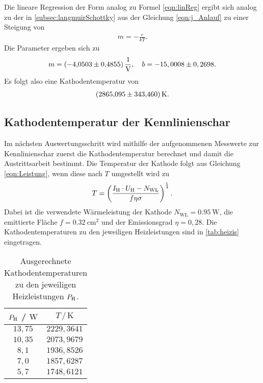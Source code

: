 \noindent
Die lineare Regression der Form analog zu Formel \eqref{eqn:linReg} ergibt sich analog zu der in \autoref{subsec:langmuirSchottky} aus der Gleichung \eqref{eqn:j_Anlauf} zu einer Steigung von
\begin{align}
  \label{eqn:steigung}
  m = -\frac{e}{kT}.
\end{align}
Die Parameter ergeben sich zu
\begin{align*}
  m =  \SI{-4,0503 \pm 0,4855}{\per\volt}, \quad
  b = -15,0008 \pm 0,2698.
\end{align*}
\noindent
Es folgt also eine Kathodentemperatur von
\begin{align*}
  \SI{2865,095 \pm 343,460}{\kelvin}.
\end{align*}

\subsection{Kathodentemperatur der Kennlinienschar}
\label{subsec:kathodenTempSchar}

Im nächsten Auswertungsschritt wird mithilfe der aufgenommenen Messwerte zur Kennlinienschar zuerst die Kathodentemperatur berechnet und damit
die Austrittsarbeit bestimmt. Die Temperatur der Kathode folgt aus Gleichung \eqref{eqn:Leistung}, wenn diese nach $T$ umgestellt wird zu 
\begin{align}
  T = \left(\frac{I_{\text H}\cdot U_{\text H} - N_{\text{WL}}}{f\eta\sigma}\right)^{\frac 14}.
\end{align}
Dabei ist die verwendete Wärmeleistung der Kathode $N_{\text{WL}} = \SI{0,95}{\watt}$, die emittierte Fläche $f=\SI{0,32}{\centi\meter\squared}$
und der Emissionsgrad $\eta = 0,28$. Die Kathodentemperaturen zu den jeweiligen Heizleistungen sind in \autoref{tab:heizis} eingetragen.

\begin{table}[H]
  \caption{Ausgerechnete Kathodentemperaturen zu den jeweiligen Heizleistungen $P_{\text H}$.}
  \label{tab:heizis}
  \centering
  \begin{tabular}{c c}
      \toprule
      $P_{\text H}$ / $\si{\watt}$ & $T \,/\, \si{\kelvin}$\\
      \midrule
      $13,75$ & $2229,3641$ \\
      $10,35$ & $2073,9679$ \\
      $8,1$   & $1936,8526$ \\
      $7,0$   & $1857,6287$ \\
      $5,7$   & $1748,6121$ \\
      \bottomrule
    \end{tabular}
\end{table}

